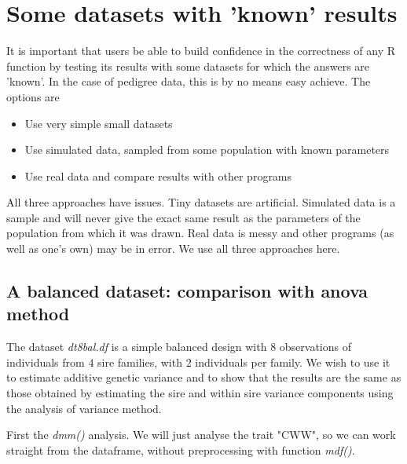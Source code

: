 \documentclass[titlepage]{article}  %
\begin{document}
\clearpage
\section{Some datasets with 'known' results}
It is important that users be able to build confidence in the correctness of any R function by testing its results with some datasets for which the answers are 'known'. In the case of pedigree data, this is by no means easy achieve. The options are
\begin{itemize}
\item Use very simple small datasets
\item Use simulated data, sampled from some population with known parameters
\item Use real data and compare results with other programs
\end{itemize}
All three approaches have issues. Tiny datasets are artificial. Simulated data is a sample and will never give the exact same result as the parameters of the population from which it was drawn. Real data is messy and other programs (as well as one's own) may be in error. We use all three approaches here.

\subsection{A balanced dataset: comparison with anova method}
 The dataset {\em dt8bal.df} is a simple balanced design with $8$ observations of individuals from $4$ sire families, with $2$ individuals per family. We wish to use it to estimate additive genetic variance and to show that the results are the same as those obtained by estimating the sire and within sire variance components using the analysis of variance method.

First the {\em dmm()} analysis. We will just analyse the trait "CWW", so we can work straight from the dataframe, without preprocessing with function {\em mdf()}.
\end{document}
